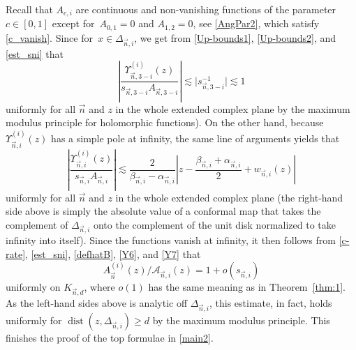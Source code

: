 \documentclass[pdftex]{sigma}
\numberwithin{equation}{section}
\newcommand{\dist}{\operatorname{dist}}
\newcommand{\n}{{\vec n}}
\begin{document}
Recall that $ A_{c,i} $ are continuous and non-vanishing functions of the parameter $ c\in[0,1] $ except for~$ {A_{0,1}=0 }$ and $ A_{1,2} =0 $, see \eqref{AngPar2}, which satisfy \eqref{c_vanish}. Since \smash{$ \Upsilon_{\n,j\pm}^{(0)}(x) = \Upsilon_{\n,j\mp}^{(i)}(x) $} for~${ x\in\Delta_{\n,i} }$, we get from \eqref{Up-bounds1}, \eqref{Up-bounds2}, and \eqref{est_sni} that
\begin{equation}
\label{Y6}
\left| \frac{\Upsilon_{\n,3-i}^{(i)}(z)}{s_{\n,3-i}A_{\n,3-i}} \right| \lesssim \big| s_{\n,3-i}^{-1} \big| \lesssim 1
\end{equation}
uniformly for all $ \n $ and $ z $ in the whole extended complex plane by the maximum modulus principle for holomorphic functions). On the other hand, because $ \Upsilon_{\n,i}^{(i)}(z) $ has a simple pole at infinity, the same line of arguments yields that
\begin{equation}
\label{Y7}
\left| \frac{\Upsilon_{\n,i}^{(i)}(z)}{s_{\n,i}A_{\n,i}} \right| \lesssim \frac2{\beta_{\n,i}-\alpha_{\n,i}} \left| z - \frac{\beta_{\n,i}+\alpha_{\n,i}}2 + w_{\n,i}(z) \right|
\end{equation}
uniformly for all $ \n $ and $ z $ in the whole extended complex plane (the right-hand side above is simply the absolute value of a conformal map that takes the complement of $ \Delta_{\n,i} $ onto the complement of the unit disk normalized to take infinity into itself). Since the functions  vanish at infinity, it then follows from \eqref{c-rate}, \eqref{est_sni}, \eqref{defhatB}, \eqref{Y6}, and \eqref{Y7} that
\[
A_\n^{(i)}(z) / \mathcal A_{\n,i}(z) = 1 + o(s_{\n,i})
\]
uniformly on $ K_{\n,d} $, where $ o(1) $ has the same meaning as in Theorem~\ref{thm:1}. As the left-hand sides above is analytic off $ \Delta_{\n,i} $, this estimate, in fact, holds uniformly for $ \dist(z,\Delta_{\n,i})\geq d $ by the maximum modulus principle. This finishes the proof of the top formulae in \eqref{main2}.
\end{document}
